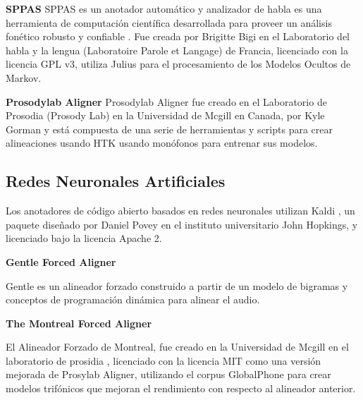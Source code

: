 \textbf{SPPAS}
SPPAS es un anotador automático y analizador de habla es una herramienta de computación científica desarrollada para proveer un análisis fonético robusto y confiable \cite{Bigi2016ASPPAS}. Fue creada por Brigitte Bigi  en el Laboratorio del habla y la lengua (Laboratoire Parole et Langage) de Francia, licenciado con la licencia GPL v3, utiliza Julius para el procesamiento de los Modelos Ocultos de Markov.

\textbf{Prosodylab Aligner}
Prosodylab Aligner \cite{Gorman2011Prosodylab-aligner:Speech} fue creado en el Laboratorio de Prosodia (Prosody Lab) en la Universidad de Mcgill en Canada, por Kyle Gorman y está compuesta de una serie de herramientas y scripts para crear alineaciones usando HTK usando monófonos para entrenar sus modelos.

\subsection{Redes Neuronales Artificiales}

Los anotadores de código abierto basados en redes neuronales utilizan Kaldi \cite{Povey_ASRU2011}, un paquete diseñado por Daniel Povey en el instituto universitario John Hopkings, y licenciado bajo la licencia Apache 2.

\textbf{Gentle Forced Aligner}

Gentle \cite{gentle} es un alineador forzado construido a partir de un modelo de bigramas y conceptos de programación dinámica para alinear el audio.

\textbf{The Montreal Forced Aligner}

El Alineador Forzado de Montreal, fue creado en la Universidad de Mcgill en el laboratorio de prosidia \cite{McAuliffe2017MontrealKaldi}, licenciado con la licencia MIT  como una versión mejorada de Prosylab Aligner, utilizando el corpus GlobalPhone  para crear modelos trifónicos que mejoran el rendimiento con respecto al alineador anterior.
